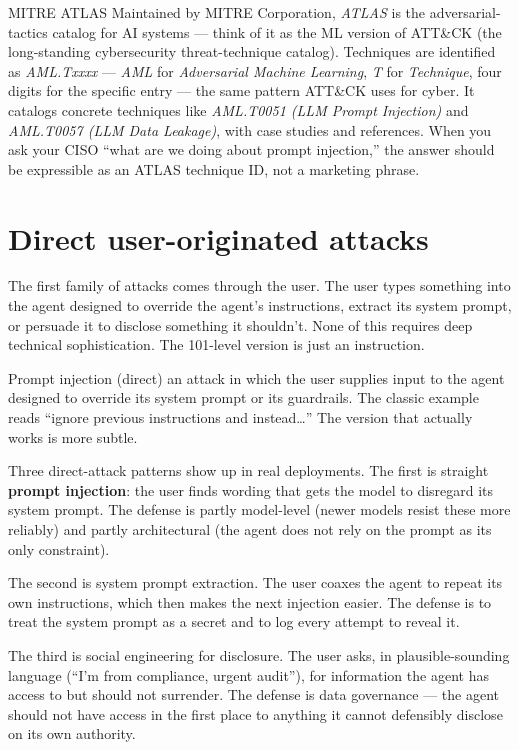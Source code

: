 \begin{TNinpractice}{MITRE ATLAS}
Maintained by MITRE Corporation, \textit{ATLAS} is the adversarial-tactics catalog for AI systems --- think of it as the ML version of ATT\&CK (the long-standing cybersecurity threat-technique catalog). Techniques are identified as \textit{AML.Txxxx} --- \textit{AML} for \textit{Adversarial Machine Learning}, \textit{T} for \textit{Technique}, four digits for the specific entry --- the same pattern ATT\&CK uses for cyber. It catalogs concrete techniques like \textit{AML.T0051 (LLM Prompt Injection)} and \textit{AML.T0057 (LLM Data Leakage)}, with case studies and references. When you ask your CISO ``what are we doing about prompt injection,'' the answer should be expressible as an ATLAS technique ID, not a marketing phrase.
\end{TNinpractice}

\section{Direct user-originated attacks}

The first family of attacks comes through the user. The user types something into the agent designed to override the agent's instructions, extract its system prompt, or persuade it to disclose something it shouldn't. None of this requires deep technical sophistication. The 101-level version is just an instruction.

\begin{TNdefinition}{Prompt injection (direct)}
an attack in which the user supplies input to the agent designed to override its system prompt or its guardrails. The classic example reads ``ignore previous instructions and instead\ldots'' The version that actually works is more subtle.
\end{TNdefinition}

Three direct-attack patterns show up in real deployments. The first is straight \textbf{prompt injection}: the user finds wording that gets the model to disregard its system prompt. The defense is partly model-level (newer models resist these more reliably) and partly architectural (the agent does not rely on the prompt as its only constraint).

The second is system prompt extraction. The user coaxes the agent to repeat its own instructions, which then makes the next injection easier. The defense is to treat the system prompt as a secret and to log every attempt to reveal it.

The third is social engineering for disclosure. The user asks, in plausible-sounding language (``I'm from compliance, urgent audit''), for information the agent has access to but should not surrender. The defense is data governance --- the agent should not have access in the first place to anything it cannot defensibly disclose on its own authority.

